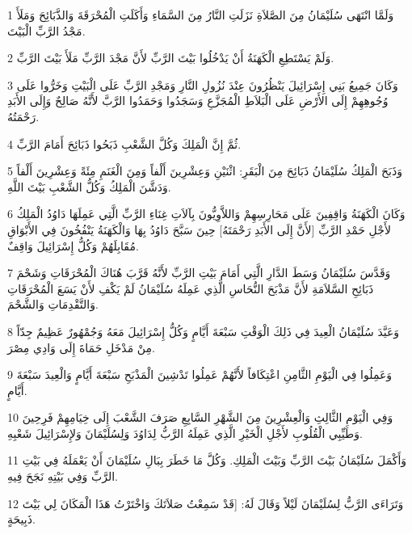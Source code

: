 \par 1 وَلَمَّا انْتَهَى سُلَيْمَانُ مِنَ الصَّلاَةِ نَزَلَتِ النَّارُ مِنَ السَّمَاءِ وَأَكَلَتِ الْمُحْرَقَةَ وَالذَّبَائِحَ وَمَلَأَ مَجْدُ الرَّبِّ الْبَيْتَ.
\par 2 وَلَمْ يَسْتَطِعِ الْكَهَنَةُ أَنْ يَدْخُلُوا بَيْتَ الرَّبِّ لأَنَّ مَجْدَ الرَّبِّ مَلَأَ بَيْتَ الرَّبِّ.
\par 3 وَكَانَ جَمِيعُ بَنِي إِسْرَائِيلَ يَنْظُرُونَ عِنْدَ نُزُولِ النَّارِ وَمَجْدِ الرَّبِّ عَلَى الْبَيْتِ وَخَرُّوا عَلَى وُجُوهِهِمْ إِلَى الأَرْضِ عَلَى الْبَلاَطِ الْمُجَزَّعِ وَسَجَدُوا وَحَمَدُوا الرَّبَّ لأَنَّهُ صَالِحٌ وَإِلَى الأَبَدِ رَحْمَتُهُ.
\par 4 ثُمَّ إِنَّ الْمَلِكَ وَكُلَّ الشَّعْبِ ذَبَحُوا ذَبَائِحَ أَمَامَ الرَّبِّ.
\par 5 وَذَبَحَ الْمَلِكُ سُلَيْمَانُ ذَبَائِحَ مِنَ الْبَقَرِ: اثْنَيْنِ وَعِشْرِينَ أَلْفاً وَمِنَ الْغَنَمِ مِئَةً وَعِشْرِينَ أَلْفاً وَدَشَّنَ الْمَلِكُ وَكُلُّ الشَّعْبِ بَيْتَ اللَّهِ.
\par 6 وَكَانَ الْكَهَنَةُ وَاقِفِينَ عَلَى مَحَارِسِهِمْ وَاللاَّوِيُّونَ بِآلاَتِ غِنَاءِ الرَّبِّ الَّتِي عَمِلَهَا دَاوُدُ الْمَلِكُ لأَجْلِ حَمْدِ الرَّبِّ [لأَنَّ إِلَى الأَبَدِ رَحْمَتَهُ] حِينَ سَبَّحَ دَاوُدُ بِهَا وَالْكَهَنَةُ يَنْفُخُونَ فِي الأَبْوَاقِ مُقَابِلَهُمْ وَكُلُّ إِسْرَائِيلَ وَاقِفٌ.
\par 7 وَقَدَّسَ سُلَيْمَانُ وَسَطَ الدَّارِ الَّتِي أَمَامَ بَيْتِ الرَّبِّ لأَنَّهُ قَرَّبَ هُنَاكَ الْمُحْرَقَاتِ وَشَحْمَ ذَبَائِحِ السَّلاَمَةِ لأَنَّ مَذْبَحَ النُّحَاسِ الَّذِي عَمِلَهُ سُلَيْمَانُ لَمْ يَكْفِ لأَنْ يَسَعَ الْمُحْرَقَاتِ وَالتَّقْدِمَاتِ وَالشَّحْمَ.
\par 8 وَعَيَّدَ سُلَيْمَانُ الْعِيدَ فِي ذَلِكَ الْوَقْتِ سَبْعَةَ أَيَّامٍ وَكُلُّ إِسْرَائِيلَ مَعَهُ وَجُمْهُورٌ عَظِيمٌ جِدّاً مِنْ مَدْخَلِ حَمَاةَ إِلَى وَادِي مِصْرَ.
\par 9 وَعَمِلُوا فِي الْيَوْمِ الثَّامِنِ اعْتِكَافاً لأَنَّهُمْ عَمِلُوا تَدْشِينَ الْمَذْبَحِ سَبْعَةَ أَيَّامٍ وَالْعِيدَ سَبْعَةَ أَيَّامٍ.
\par 10 وَفِي الْيَوْمِ الثَّالِثِ وَالْعِشْرِينَ مِنَ الشَّهْرِ السَّابِعِ صَرَفَ الشَّعْبَ إِلَى خِيَامِهِمْ فَرِحِينَ وَطَيِّبِي الْقُلُوبِ لأَجْلِ الْخَيْرِ الَّذِي عَمِلَهُ الرَّبُّ لِدَاوُدَ وَلِسُلَيْمَانَ وَلإِسْرَائِيلَ شَعْبِهِ.
\par 11 وَأَكْمَلَ سُلَيْمَانُ بَيْتَ الرَّبِّ وَبَيْتَ الْمَلِكِ. وَكُلَّ مَا خَطَرَ بِبَالِ سُلَيْمَانَ أَنْ يَعْمَلَهُ فِي بَيْتِ الرَّبِّ وَفِي بَيْتِهِ نَجَحَ فِيهِ.
\par 12 وَتَرَاءَى الرَّبُّ لِسُلَيْمَانَ لَيْلاً وَقَالَ لَهُ: [قَدْ سَمِعْتُ صَلاَتَكَ وَاخْتَرْتُ هَذَا الْمَكَانَ لِي بَيْتَ ذَبِيحَةٍ.
